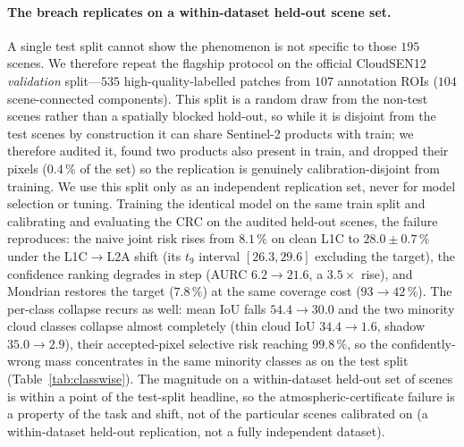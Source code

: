 \documentclass[preprint,3p,times]{elsarticle}
\begin{document}
\paragraph{The breach replicates on a within-dataset held-out scene set.} A single test split cannot show the phenomenon is not specific to those $195$ scenes. We therefore repeat the flagship protocol on the official CloudSEN12 \emph{validation} split---$535$ high-quality-labelled patches from $107$ annotation ROIs ($104$ scene-connected components). This split is a random draw from the non-test scenes rather than a spatially blocked hold-out, so while it is disjoint from the test scenes by construction it can share Sentinel-2 products with train; we therefore audited it, found two products also present in train, and dropped their pixels ($0.4\,\%$ of the set) so the replication is genuinely calibration-disjoint from training. We use this split only as an independent replication set, never for model selection or tuning. Training the identical model on the same train split and calibrating and evaluating the CRC on the audited held-out scenes, the failure reproduces: the naive joint risk rises from $8.1\,\%$ on clean L1C to $28.0 \pm 0.7\,\%$ under the L1C$\to$L2A shift (its $t_9$ interval $[26.3, 29.6]$ excluding the target), the confidence ranking degrades in step (AURC $6.2 \to 21.6$, a $3.5\times$ rise), and Mondrian restores the target ($7.8\,\%$) at the same coverage cost ($93 \to 42\,\%$). The per-class collapse recurs as well: mean IoU falls $54.4 \to 30.0$ and the two minority cloud classes collapse almost completely (thin cloud IoU $34.4 \to 1.6$, shadow $35.0 \to 2.9$), their accepted-pixel selective risk reaching $99.8\,\%$, so the confidently-wrong mass concentrates in the same minority classes as on the test split (Table~\ref{tab:classwise}). The magnitude on a within-dataset held-out set of scenes is within a point of the test-split headline, so the atmospheric-certificate failure is a property of the task and shift, not of the particular scenes calibrated on (a within-dataset held-out replication, not a fully independent dataset).
\end{document}

